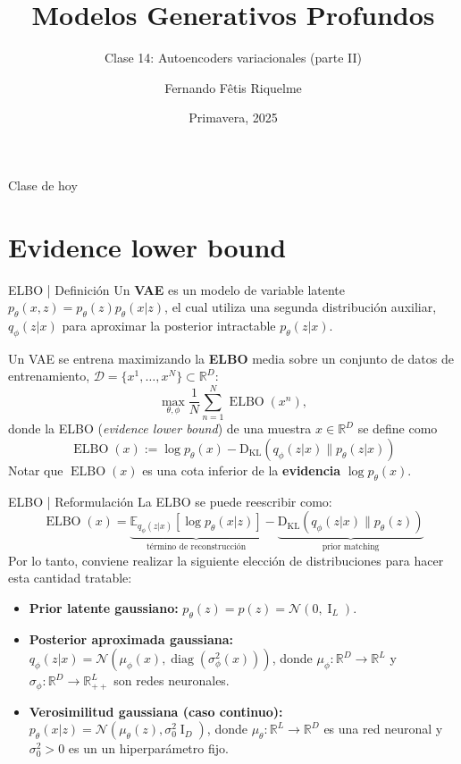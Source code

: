 \documentclass{beamer}
\title{Modelos Generativos Profundos}
\subtitle{Clase 14: Autoencoders variacionales (parte II)}
\author{Fernando Fêtis Riquelme}
\institute{
    Facultad de Ciencias Físicas y Matemáticas\\
    Universidad de Chile
}
\date{Primavera, 2025}
\newcommand{\R}{\mathbb{R}}
\begin{document}
\begin{frame}
    \titlepage
\end{frame}

\begin{frame}{Clase de hoy}
    \tableofcontents
\end{frame}

\section{Evidence lower bound}

\begin{frame}{ELBO | Definición}
    Un \textbf{VAE} es un modelo de variable latente $p_\theta(x,z)=p_\theta(z)p_\theta(x|z)$, el cual utiliza una segunda distribución auxiliar, $q_\phi(z|x)$ para aproximar la posterior intractable $p_\theta(z|x)$.

    Un VAE se entrena maximizando la \textbf{ELBO} media sobre un conjunto de datos de entrenamiento, $\mathcal{D}=\{x^1,\ldots,x^N\}\subset\R^D$:
    \begin{equation*}
        \max_{\theta,\phi} \frac{1}{N}\sum_{n=1}^N \operatorname{ELBO}(x^n),
    \end{equation*}
    donde la ELBO (\textit{evidence lower bound}) de una muestra $x\in\R^D$ se define como
    \begin{equation*}
        \operatorname{ELBO}(x):=\log p_\theta(x)-\operatorname{{D}_{KL}}\left(q_\phi(z|x)\| p_\theta(z|x)\right)
    \end{equation*}
    Notar que $\operatorname{ELBO}(x)$ es una cota inferior de la \textbf{evidencia} $\log p_\theta(x)$.
\end{frame}

\begin{frame}{ELBO | Reformulación}
    La ELBO se puede reescribir como:
    \begin{equation*}
        \operatorname{ELBO}(x) = \underbrace{\mathbb{E}_{q_\phi(z|x)}\left[\log p_\theta(x|z)\right]}_{\text{término de reconstrucción}} - \underbrace{\operatorname{{D}_{KL}}\left(q_\phi(z|x)\| p_\theta(z)\right)}_{\text{prior matching}}
    \end{equation*}
    Por lo tanto, conviene realizar la siguiente elección de distribuciones para hacer esta cantidad tratable:
    \begin{itemize}
        \item \textbf{Prior latente gaussiano:} $p_\theta(z) = p(z) = \mathcal{N}( 0, \operatorname{I}_L)$.
        \item \textbf{Posterior aproximada gaussiana:} $q_\phi(z|x) = \mathcal{N}(\mu_\phi(x), \operatorname{diag}(\sigma^2_\phi(x)))$, donde $\mu_\phi:\R^D\to\R^L$ y $\sigma_\phi:\R^D\to\R^L_{++}$ son redes neuronales.
        \item \textbf{Verosimilitud gaussiana (caso continuo):} $p_\theta(x|z) = \mathcal{N}(\mu_\theta(z), \sigma^2_0\operatorname{I}_D)$, donde $\mu_\theta:\R^L\to\R^D$ es una red neuronal y $\sigma^2_0>0$ es un un hiperparámetro fijo.
    \end{itemize}
\end{frame}
\end{document}
